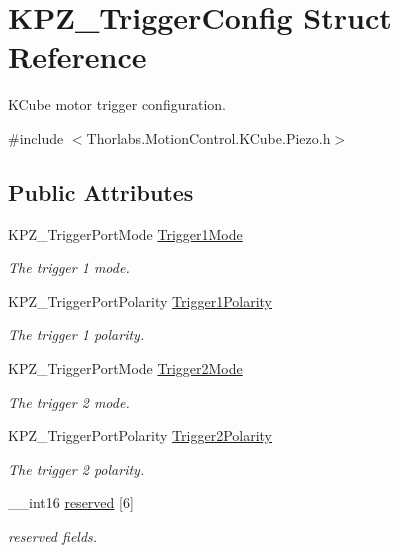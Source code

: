 \hypertarget{struct_k_p_z___trigger_config}{}\section{K\+P\+Z\+\_\+\+Trigger\+Config Struct Reference}
\label{struct_k_p_z___trigger_config}


K\+Cube motor trigger configuration.  




{\ttfamily \#include $<$Thorlabs.\+Motion\+Control.\+K\+Cube.\+Piezo.\+h$>$}

\subsection*{Public Attributes}
\begin{DoxyCompactItemize}
\item 
K\+P\+Z\+\_\+\+Trigger\+Port\+Mode \hyperlink{struct_k_p_z___trigger_config_a8a2f91f214ce0b2172ed28b98c46000f}{Trigger1\+Mode}
\begin{DoxyCompactList}\small\item\em The trigger 1 mode. \end{DoxyCompactList}\item 
K\+P\+Z\+\_\+\+Trigger\+Port\+Polarity \hyperlink{struct_k_p_z___trigger_config_abc214bcc624f69de9abf00d184bfe50e}{Trigger1\+Polarity}
\begin{DoxyCompactList}\small\item\em The trigger 1 polarity. \end{DoxyCompactList}\item 
K\+P\+Z\+\_\+\+Trigger\+Port\+Mode \hyperlink{struct_k_p_z___trigger_config_a59701ce15d64b32624ab5cc8312c5d58}{Trigger2\+Mode}
\begin{DoxyCompactList}\small\item\em The trigger 2 mode. \end{DoxyCompactList}\item 
K\+P\+Z\+\_\+\+Trigger\+Port\+Polarity \hyperlink{struct_k_p_z___trigger_config_a981908163f523061ccee8447d5dc2953}{Trigger2\+Polarity}
\begin{DoxyCompactList}\small\item\em The trigger 2 polarity. \end{DoxyCompactList}\item 
\+\_\+\+\_\+int16 \hyperlink{struct_k_p_z___trigger_config_a6c2d04afec4cf82f436c161ddfe5b4b4}{reserved} \mbox{[}6\mbox{]}
\begin{DoxyCompactList}\small\item\em reserved fields. \end{DoxyCompactList}\end{DoxyCompactItemize}



